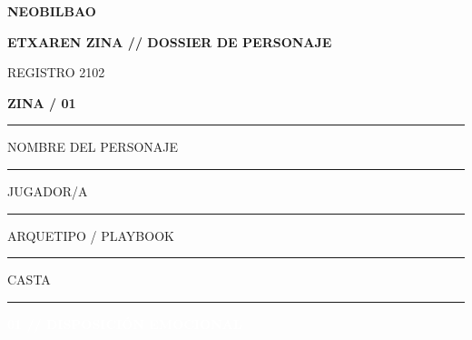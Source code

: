 \documentclass[10pt,a4paper,oneside]{book}
\newcommand{\field}[2][\linewidth]{%
  \begin{minipage}[t]{#1}
  \textcolor{InkSoft}{\terminalfont\scriptsize\MakeUppercase{#2}}\par
  \vspace{1.5mm}\textcolor{Line}{\rule{\linewidth}{0.45pt}}
  \end{minipage}}
\newcommand{\strip}[1]{%
  \vspace{1mm}\noindent
  \colorbox{CarbonDark}{\parbox{\dimexpr\linewidth-2\fboxsep\relax}{%
    \textcolor{white}{\industrialfont\bfseries\small\MakeUppercase{#1}}}}\par
  \vspace{1mm}}
\begin{document}
\pagecolor{Paper}

\noindent
\begin{minipage}[c]{0.68\linewidth}
  {\industrialfont\bfseries\fontsize{24}{25}\selectfont\color{CarbonDark}NEOBILBAO}\par
  \vspace{1mm}
  {\industrialfont\bfseries\small\color{OrekakRust}ETXAREN ZINA \textcolor{BurdinUrdin}{//} DOSSIER DE PERSONAJE}
\end{minipage}%
\hfill
\begin{minipage}[c]{0.28\linewidth}
  \raggedleft
  {\terminalfont\scriptsize\color{InkSoft}REGISTRO 2102}\par
  {\industrialfont\bfseries\large\color{BurdinUrdin}ZINA / 01}
\end{minipage}

\vspace{2mm}
\textcolor{OrekakRust}{\rule{\linewidth}{1.4pt}}
\vspace{2mm}

\begin{minipage}[t]{0.58\linewidth}
  \field{Nombre del personaje}
\end{minipage}\hfill
\begin{minipage}[t]{0.38\linewidth}
  \field{Jugador/a}
\end{minipage}

\vspace{1mm}
\begin{minipage}[t]{0.58\linewidth}
  \field{Arquetipo / playbook}
\end{minipage}\hfill
\begin{minipage}[t]{0.38\linewidth}
  \field{Casta}
\end{minipage}

\strip{01 // Disposición emocional}
\end{document}
